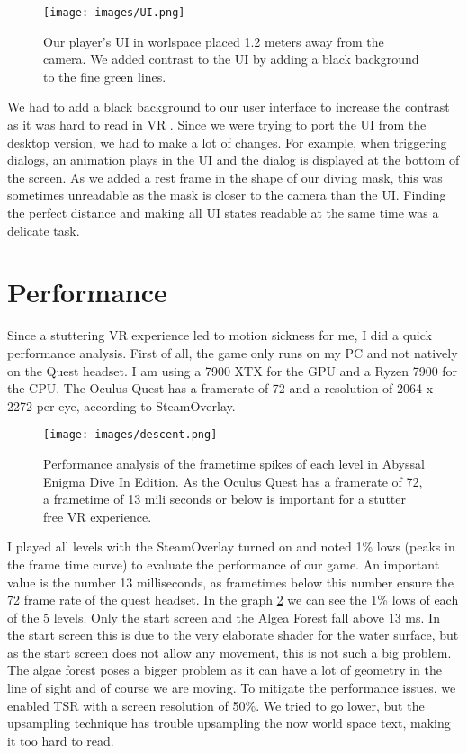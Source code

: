 \documentclass[letterpaper, 10 pt, conference]{ieeeconf}  %
\begin{document}
\begin{figure}[!ht]
    \caption{Our player's UI in worlspace placed 1.2 meters away from the camera. We added contrast to the UI by adding a black background to the fine green lines.}
    \centering
    \texttt{[image: images/UI.png]}
    \label{fig:UI}
\end{figure}

We had to add a black background to our user interface to increase the contrast as it was hard to read in VR \cite{dingler2018vr}.
Since we were trying to port the UI from the desktop version, we had to make a lot of changes.
For example, when triggering dialogs, an animation plays in the UI and the dialog is displayed at the bottom of the screen.
As we added a rest frame in the shape of our diving mask, this was sometimes unreadable as the mask is closer to the camera than the UI.
Finding the perfect distance and making all UI states readable at the same time was a delicate task.

\section{Performance}
\label{Sec:Performance}

Since a stuttering VR experience led to motion sickness for me, I did a quick performance analysis.
First of all, the game only runs on my PC and not natively on the Quest headset.
I am using a 7900 XTX for the GPU and a Ryzen 7900 for the CPU.
The Oculus Quest has a framerate of 72 and a resolution of 2064 x 2272 per eye, according to SteamOverlay. 

\begin{figure}[!ht]
    \caption{Performance analysis of the frametime spikes of each level in Abyssal Enigma Dive In Edition. 
    As the Oculus Quest has a framerate of 72, a frametime of 13 mili seconds or below is important for a stutter free VR experience.}
    \centering
    \texttt{[image: images/descent.png]}
    \label{fig:descent}
\end{figure}

I played all levels with the SteamOverlay turned on and noted 1\% lows (peaks in the frame time curve) to evaluate the performance of our game.
An important value is the number 13 milliseconds, as frametimes below this number ensure the 72 frame rate of the quest headset. 
In the graph \ref{fig:descent} we can see the 1\% lows of each of the 5 levels.
Only the start screen and the Algea Forest fall above 13 ms.
In the start screen this is due to the very elaborate shader for the water surface, but as the start screen does not allow any movement, this is not such a big problem.
The algae forest poses a bigger problem as it can have a lot of geometry in the line of sight and of course we are moving.
To mitigate the performance issues, we enabled TSR with a screen resolution of 50\%.
We tried to go lower, but the upsampling technique has trouble upsampling the now world space text, making it too hard to read.
\end{document}
